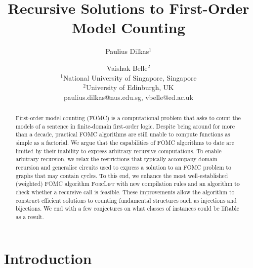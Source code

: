 \documentclass{article}
\title{Recursive Solutions to First-Order Model Counting}
\author{%
Paulius Dilkas$^1$\and
Vaishak Belle$^2$\\
\affiliations
$^1$National University of Singapore, Singapore\\
$^2$University of Edinburgh, UK\\
\emails
paulius.dilkas@nus.edu.sg,
vbelle@ed.ac.uk
}
\theoremstyle{definition}
\begin{document}
\maketitle

\begin{abstract}
  First-order model counting (FOMC) is a computational problem that asks to
  count the models of a sentence in finite-domain first-order logic. Despite
  being around for more than a decade, practical FOMC algorithms are still
  unable to compute functions as simple as a factorial. We argue that the
  capabilities of FOMC algorithms to date are limited by their inability to
  express arbitrary recursive computations. To enable arbitrary recursion, we
  relax the restrictions that typically accompany domain recursion and
  generalise circuits used to express a solution to an FOMC problem to graphs
  that may contain cycles. To this end, we enhance the most well-established
  (weighted) FOMC algorithm \textsc{ForcLift} with new compilation rules and an
  algorithm to check whether a recursive call is feasible. These improvements
  allow the algorithm to construct efficient solutions to counting fundamental
  structures such as injections and bijections. We end with a few conjectures on
  what classes of instances could be liftable as a result.
\end{abstract}

\section{Introduction}

\end{document}

